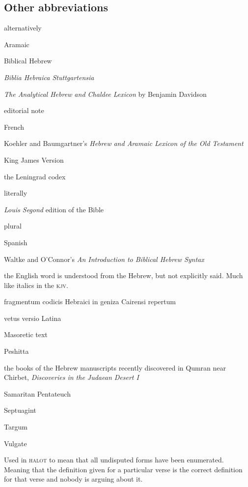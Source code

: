 \subsection{Other abbreviations}
\begin{description}[labelsep=3em, font=\normalfont, itemsep=-0.25em]
    \item[\textsc{alt}] alternatively
    \item[Aram.] Aramaic
    \item[\textsc{bh}] Biblical Hebrew
    \item[\textsc{bhs}] \textit{Biblia Hebraica Stuttgartensia}
    \item[Davidson] \textit{The Analytical Hebrew and Chaldee Lexicon} by Benjamin Davidson
    \item[\textsc{ed}] editorial note
    \item[Fr.] French
    \item[\textsc{halot}] Koehler and Baumgartner's \textit{Hebrew and Aramaic Lexicon of the Old Testament}
    \item[\textsc{kjv}] King James Version
    \item[L] the Leningrad codex
    \item[\textsc{lit}] literally
    \item[\textsc{lsg}] \textit{Louis Segond} edition of the Bible
    \item[pl.] plural
    \item[Sp.] Spanish
    \item [W\&O] Waltke and O'Connor's \textit{An Introduction to Biblical Hebrew Syntax}
    \item[\textdegree\dots$\mathscr{U}$] the English word is understood from the Hebrew, but not explicitly said. Much like italics in the \textsc{kjv}.
    \item[\fragheb] fragmentum codicis Hebraici in geniza Cairensi repertum
    \item[\latina] vetus versio Latina
    \item[\masoretic] Masoretic text
    \item[\peshitta] Peshitta
    \item[\qumran] the books of the Hebrew manuscripts recently discovered in Qumran near Chirbet, \textit{Discoveries in the Judaean Desert I}
    \item[\sampen] Samaritan Pentateuch
    \item[\septuagint] Septuagint
    \item[\targum] Targum
    \item[\vulgate] Vulgate
    \item[\hadagger] Used in \textsc{halot} to mean that all undisputed forms have been enumerated. Meaning that the definition given for a particular verse is the correct definition for that verse and nobody is arguing about it.
\end{description}

